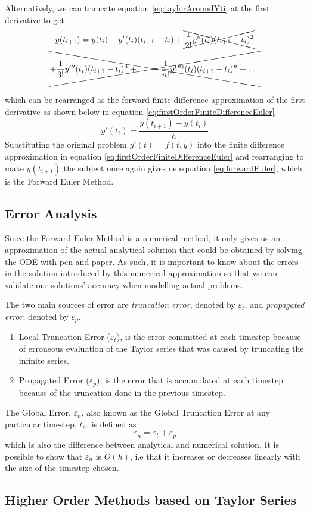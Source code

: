 Alternatively, we can truncate equation \ref{eq:taylorAroundYti} at the first derivative  to get 
\begin{multline*}
     y(t_{i+1})=y(t_i) + y'(t_i)(t_{i+1}-t_i) + \xcancel{\frac{1}{2!}y''(t_i)(t_{i+1}-t_i)^2} \\\xcancel{+ \frac{1}{3!}y'''(t_i)(t_{i+1}-t_i)^3  +\, \dots\, + \frac{1}{n!}y^{(n)}(t_i)(t_{i+1}-t_i)^n +\, \dots}
\end{multline*}
\\
which can be rearranged as the forward finite difference approximation of the first derivative as shown below in equation \ref{eq:firstOrderFiniteDifferenceEuler}
\begin{equation}\label{eq:firstOrderFiniteDifferenceEuler}
    y'(t_i) = \frac{y(t_{i + 1}) - y(t_i)}{h}
\end{equation}
Substituting the original problem $y'(t) = f(t, y)$ into the finite difference approximation in equation \ref{eq:firstOrderFiniteDifferenceEuler} and rearranging to make $y(t_{i+1})$ the subject once again gives us equation \ref{eq:forwardEuler}, which is the Forward Euler Method. 

\subsection{Error Analysis}
Since the Forward Euler Method is a numerical method, it only gives us an approximation of the actual analytical solution that could be obtained by solving the ODE with pen and paper. As such, it is important to know about the errors in the solution introduced by this numerical approximation so that we can validate our solutions' accuracy when modelling actual problems.

The two main sources of error are \emph{truncation error}, denoted by $\varepsilon_t$, and \emph{propagated error}, denoted by $\varepsilon_p$.
\begin{enumerate}
    \item Local Truncation Error ($\varepsilon_t$), is the error committed at each timestep because of erroneous evaluation of the Taylor series that was caused by truncating the infinite series.
    \item Propagated Error ($\varepsilon_p$), is the error that is accumulated at each timestep because of the truncation done in the previous timestep. 
\end{enumerate}
The Global Error, $\varepsilon_n$, also known as the Global Truncation Error at any  particular timestep, $t_n$, is defined as
\begin{equation}
\varepsilon_n = \varepsilon_t + \varepsilon_p 
\end{equation}
which is also the difference between analytical and numerical solution. It is possible to show that $\varepsilon_n$ is $O(h)$, i.e that it increases or decreases linearly with the size of the timestep chosen.

\subsection{Higher Order Methods based on Taylor Series}
